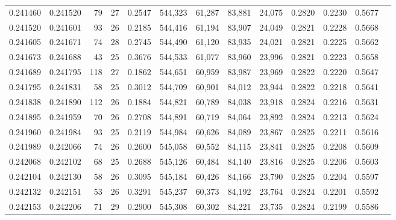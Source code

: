 \begin{tabular}{rrrrrrrrrrrrr}
0.241460 & 0.241520 &  79 &  27 &                                     0.2547 & 544,323 &  61,287 &  83,881 &  24,075 & 0.2820 & 0.2230 & 0.5677 \\
0.241520 & 0.241601 &  93 &  26 &                                     0.2185 & 544,416 &  61,194 &  83,907 &  24,049 & 0.2821 & 0.2228 & 0.5668 \\
0.241605 & 0.241671 &  74 &  28 &                                     0.2745 & 544,490 &  61,120 &  83,935 &  24,021 & 0.2821 & 0.2225 & 0.5662 \\
0.241673 & 0.241688 &  43 &  25 &                                     0.3676 & 544,533 &  61,077 &  83,960 &  23,996 & 0.2821 & 0.2223 & 0.5658 \\
0.241689 & 0.241795 & 118 &  27 &                                     0.1862 & 544,651 &  60,959 &  83,987 &  23,969 & 0.2822 & 0.2220 & 0.5647 \\
0.241795 & 0.241831 &  58 &  25 &                                     0.3012 & 544,709 &  60,901 &  84,012 &  23,944 & 0.2822 & 0.2218 & 0.5641 \\
0.241838 & 0.241890 & 112 &  26 &                                     0.1884 & 544,821 &  60,789 &  84,038 &  23,918 & 0.2824 & 0.2216 & 0.5631 \\
0.241895 & 0.241959 &  70 &  26 &                                     0.2708 & 544,891 &  60,719 &  84,064 &  23,892 & 0.2824 & 0.2213 & 0.5624 \\
0.241960 & 0.241984 &  93 &  25 &                                     0.2119 & 544,984 &  60,626 &  84,089 &  23,867 & 0.2825 & 0.2211 & 0.5616 \\
0.241989 & 0.242066 &  74 &  26 &                                     0.2600 & 545,058 &  60,552 &  84,115 &  23,841 & 0.2825 & 0.2208 & 0.5609 \\
0.242068 & 0.242102 &  68 &  25 &                                     0.2688 & 545,126 &  60,484 &  84,140 &  23,816 & 0.2825 & 0.2206 & 0.5603 \\
0.242104 & 0.242130 &  58 &  26 &                                     0.3095 & 545,184 &  60,426 &  84,166 &  23,790 & 0.2825 & 0.2204 & 0.5597 \\
0.242132 & 0.242151 &  53 &  26 &                                     0.3291 & 545,237 &  60,373 &  84,192 &  23,764 & 0.2824 & 0.2201 & 0.5592 \\
0.242153 & 0.242206 &  71 &  29 &                                     0.2900 & 545,308 &  60,302 &  84,221 &  23,735 & 0.2824 & 0.2199 & 0.5586 \\

\end{tabular}
